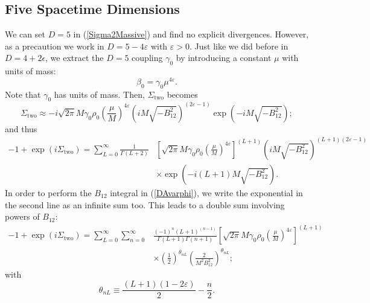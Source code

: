 \subsection{Five Spacetime Dimensions}
We can set $D = 5$ in (\ref{Sigma2Massive}) and find no explicit divergences. However, as a precaution we work in $D = 5 - 4 \varepsilon$ with $\varepsilon > 0$. Just like we did before in $D = 4 + 2 \epsilon$, we extract the $D = 5$ coupling $\gamma_{0}$ by introducing a constant $\mu$ with units of mass:
\begin{equation}
	\beta_{0} = \gamma_{0} \mu^{4 \varepsilon}.
\end{equation}
Note that $\gamma_{0}$ has units of mass. Then, $\Sigma_{\text{two}}$ becomes
\begin{equation}
	\Sigma_{\text{two}} \approx -i \sqrt{2 \pi} M\gamma_{0} \rho_{0} \left( \frac{\mu}{M} \right)^{4\varepsilon} \left(i M \sqrt{-B_{12}^{2}}\right)^{(2\varepsilon - 1)} \exp{\left(- i M \sqrt{-B_{12}^{2}}\right)};
\end{equation}
and thus
\begin{equation}
\begin{split}
	{-1} + \exp{(i \Sigma_{\text{two}})} = \sum_{L = 0}^{\infty} \frac{1}{\Gamma(L + 2)} {}& \left[ \sqrt{2 \pi} M \gamma_{0} \rho_{0} \left( \frac{\mu}{M} \right)^{4\varepsilon} \right]^{(L+1)} \left(i M \sqrt{-B_{12}^{2}}\right)^{(L+1)(2\varepsilon - 1)} \\
	&\times \exp{\left(- i (L+1) M \sqrt{-B_{12}^{2}}\right)}.
\end{split}
\end{equation}
In order to perform the $B_{12}$ integral in (\ref{DAvarphi}), we write the exponential in the second line as an infinite sum too. This leads to a double sum involving powers of $B_{12}$:
\begin{equation}
\begin{split}
	{-1} + \exp{(i \Sigma_{\text{two}})} = \sum_{L = 0}^{\infty} \sum_{n = 0}^{\infty} {}& \frac{(-1)^{n}(L+1)^{(n - 1)}}{\Gamma(L + 1)\Gamma(n+1)} \left[ \sqrt{2 \pi} M \gamma_{0} \rho_{0} \left( \frac{\mu}{M} \right)^{4\varepsilon} \right]^{(L+1)} \\
	&\times \left(\frac{1}{2}\right)^{\theta_{nL}} \left( \frac{2}{M^{2} B_{12}^{2}} \right)^{\theta_{nL}};
\end{split}
\end{equation}
with
\begin{equation}
	\theta_{nL} \equiv \frac{(L+1)(1 - 2\varepsilon)}{2} - \frac{n}{2}.
\end{equation}

